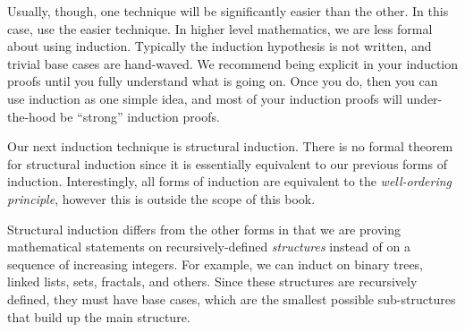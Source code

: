 \documentclass[main.tex]{subfiles}
\begin{document}
Usually, though, one technique will be significantly easier than the other. In this case, use the easier technique. In higher level mathematics, we are less formal about using induction. Typically the induction hypothesis is not written, and trivial base cases are hand-waved. We recommend being explicit in your induction proofs until you fully understand what is going on. Once you do, then you can use induction as one simple idea, and most of your induction proofs will under-the-hood be ``strong'' induction proofs.

\sectionbreak

Our next induction technique is structural induction. There is no formal theorem for structural induction since it is essentially equivalent to our previous forms of induction. Interestingly, all forms of induction are equivalent to the \textit{well-ordering principle}, however this is outside the scope of this book.

Structural induction differs from the other forms in that we are proving mathematical statements on recursively-defined \textit{structures} instead of on a sequence of increasing integers. For example, we can induct on binary trees, linked lists, sets, fractals, and others. Since these structures are recursively defined, they must have base cases, which are the smallest possible sub-structures that build up the main structure.
\end{document}
